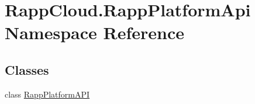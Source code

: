 \hypertarget{namespaceRappCloud_1_1RappPlatformApi}{\section{Rapp\-Cloud.\-Rapp\-Platform\-Api Namespace Reference}
\label{namespaceRappCloud_1_1RappPlatformApi}
}
\subsection*{Classes}
\begin{DoxyCompactItemize}
\item 
class \hyperlink{classRappCloud_1_1RappPlatformApi_1_1RappPlatformAPI}{Rapp\-Platform\-A\-P\-I}
\end{DoxyCompactItemize}
